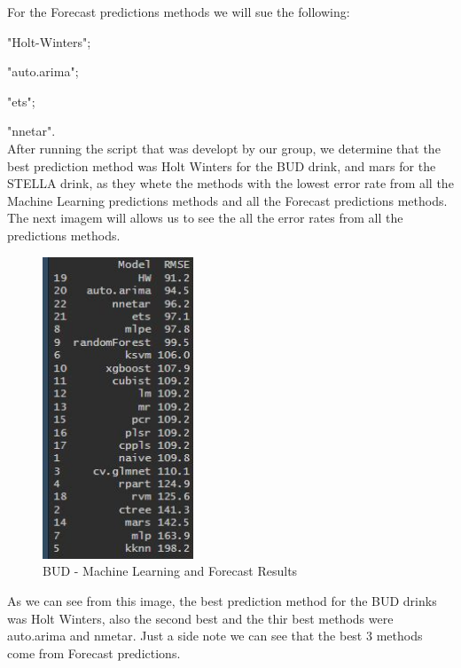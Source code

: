 For the Forecast predictions methods we will sue the following:

\quad \textbullet "Holt-Winters";

\quad \textbullet "auto.arima";

\quad \textbullet "ets";

\quad \textbullet "nnetar".\\

After running the script that was developt by our group, we determine that the best prediction method was Holt Winters for the BUD drink, and mars for the STELLA drink, as they whete the methods with the lowest error rate from all the Machine Learning predictions methods and all the Forecast predictions methods. The next imagem will allows us to see the all the error rates from all the predictions methods.\\

\begin{figure}[H]
    \centering
    \includegraphics[width=0.4\textwidth]{assets/bud-split.jpeg}
    \caption{BUD - Machine Learning and Forecast Results}
    \label{fig:split_bud}
    \end{figure}

As we can see from this image, the best prediction method for the BUD drinks was Holt Winters, also the second best and the thir best methods were auto.arima and nmetar. Just a side note we can see that the best 3 methods come from Forecast predictions.\\


